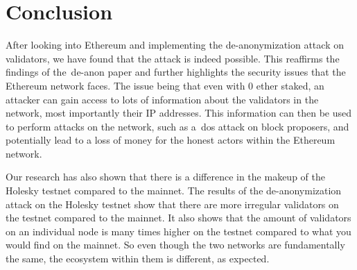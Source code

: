 

\section{Conclusion}\label{sec:conclusion}
After looking into Ethereum and implementing the de-anonymization attack on validators, we have found that the attack is indeed possible.
This reaffirms the findings of the~\gls{de-anon paper} and further highlights the security issues that the Ethereum network faces.
The issue being that even with 0 ether staked, an attacker can gain access to lots of information about the validators in the network, most importantly their IP addresses.
This information can then be used to perform attacks on the network, such as a~\gls{dos} attack on block proposers, and potentially lead to a loss of money for the honest actors within the Ethereum network.


Our research has also shown that there is a difference in the makeup of the Holesky testnet compared to the mainnet.
The results of the de-anonymization attack on the Holesky testnet show that there are more irregular validators on the testnet compared to the mainnet.
It also shows that the amount of validators on an individual node is many times higher on the testnet compared to what you would find on the mainnet.
So even though the two networks are fundamentally the same, the ecosystem within them is different, as expected.